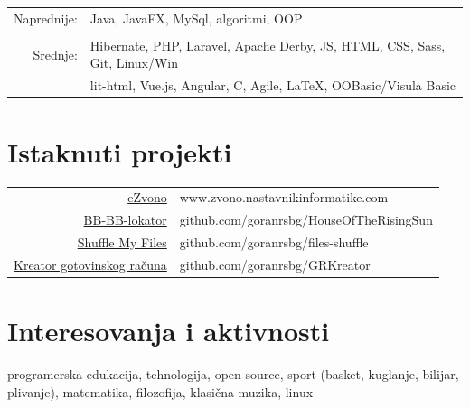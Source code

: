 \documentclass[a4paper,11pt]{article}
\begin{document}
{  \begin{tabular}{r|l}
    Naprednije: & Java, JavaFX, MySql, algoritmi, OOP\\
     \multicolumn{2}{c}{} \\
    Srednje:  & Hibernate, PHP, Laravel, Apache Derby, JS,  HTML, CSS, Sass, Git, Linux/Win\\ 
              & lit-html, Vue.js, Angular, C, Agile, {\LaTeX}, OOBasic/Visula Basic\\

  \end{tabular}
  
  \section*{Istaknuti projekti}
    
    \begin{tabular}{r|l}
    
      \href{http://www.zvono.nastavnikinformatike.com}{\textcolor{links}{eZvono}} & www.zvono.nastavnikinformatike.com\\
      \href{https://github.com/goranrsbg/HouseOfTheRisingSun}{\textcolor{links}{BB-BB-lokator}} & github.com/goranrsbg/HouseOfTheRisingSun\\
      \href{https://github.com/goranrsbg/files-shuffle}{\textcolor{links}{Shuffle My Files}} & github.com/goranrsbg/files-shuffle\\
      \href{https://github.com/goranrsbg/GRKreator}{\textcolor{links}{Kreator gotovinskog računa}} & github.com/goranrsbg/GRKreator\\
    
    \end{tabular}
    
  \section*{Interesovanja i aktivnosti}

   programerska edukacija, tehnologija, open-source, sport (basket, kuglanje, bilijar, plivanje),
   matematika, filozofija, klasična muzika, linux
  
}
\end{document}
